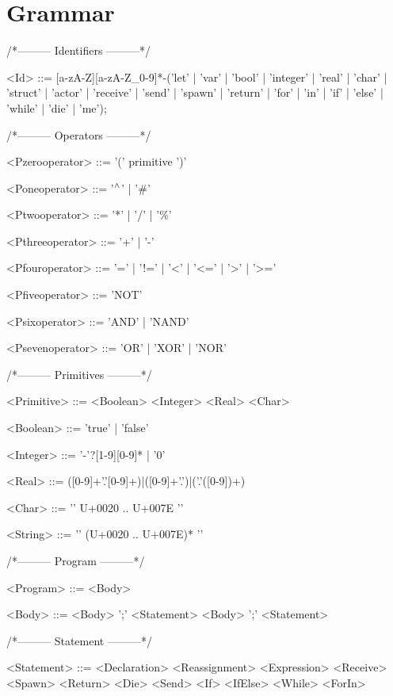 \chapter*{Grammar}
\setlength{\grammarindent}{100pt}
/*--------- Identifiers ---------*/
\begin{grammar}
<Id> ::= [a-zA-Z][a-zA-Z\_0-9]*-('let' | 'var' | 'bool' | 'integer' | 'real' | 'char' | 'struct' | 'actor' | 'receive' | 'send' | 'spawn' | 'return' | 'for' | 'in' | 'if' | 'else' | 'while' | 'die' | 'me');
\end{grammar}
/*--------- Operators ---------*/
\begin{grammar}
<Pzerooperator> ::= '(' primitive ')'

<Poneoperator> ::= '$^\wedge{}$' | '\#'

<Ptwooperator> ::= '*' | '/' | '\%'

<Pthreeoperator> ::= '+' | '-'

<Pfouroperator> ::= '=' | '!=' | '<' | '<=' | '>' | '>='

<Pfiveoperator> ::= 'NOT'

<Psixoperator> ::= 'AND' | 'NAND'

<Psevenoperator> ::= 'OR' | 'XOR' | 'NOR'
\end{grammar}
/*--------- Primitives ---------*/
\begin{grammar}

<Primitive> ::= <Boolean>
\alt <Integer>
\alt <Real>
\alt <Char>

<Boolean> ::= 'true' | 'false'

<Integer> ::= '-'?[1-9][0-9]* | '0'

<Real> ::= ([0-9]+'.'[0-9]+)|([0-9]+'.')|('.'([0-9])+)

<Char> ::= '\textquotesingle' U+0020 .. U+007E '\textquotesingle'

<String> ::= '\textquotedbl' (U+0020 .. U+007E)* '\textquotedbl'


\end{grammar}
/*--------- Program ---------*/
\begin{grammar}
<Program> ::= <Body>

<Body> ::= <Body> ';' <Statement>
 \alt <Body> ';'
 \alt <Statement>

\end{grammar}
/*--------- Statement ---------*/
\begin{grammar}
<Statement> ::= <Declaration>
 \alt <Reassignment>
 \alt <Expression>
 \alt <Receive>
 \alt <Spawn>
 \alt <Return>
 \alt <Die>
 \alt <Send>
 \alt <If>
 \alt <IfElse>
 \alt <While>
 \alt <ForIn>

\end{grammar}

